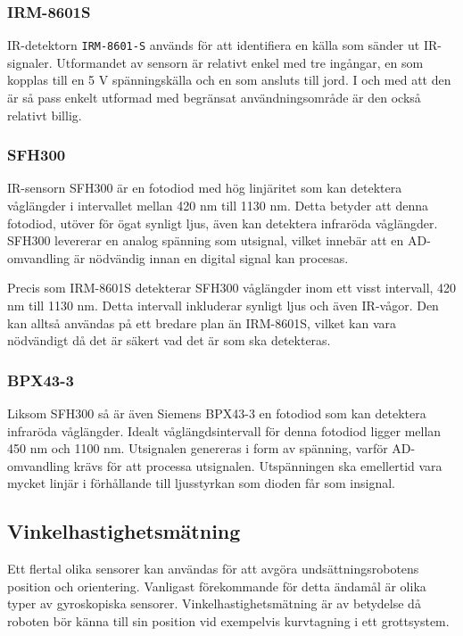 \documentclass[11pt]{article}
\begin{document}
\begin{flushleft}
\subsubsection{IRM-8601S} %
IR-detektorn \verb+IRM-8601-S+ används för att identifiera en källa som sänder ut IR-signaler. Utformandet av sensorn är relativt enkel med tre ingångar, en som kopplas till en 5 V spänningskälla och en som ansluts till jord. I och med att den är så pass enkelt utformad med begränsat användningsområde är den också relativt billig. \cite{IRM}

\subsubsection{SFH300} %
IR-sensorn SFH300 är en fotodiod med hög linjäritet som kan detektera våglängder i intervallet mellan 420 nm till 1130 nm. Detta betyder att denna fotodiod, utöver för ögat synligt ljus, även kan detektera infraröda våglängder. SFH300 levererar en analog spänning som utsignal, vilket innebär att en AD-omvandling är nödvändig innan en digital signal kan procesas. \cite{Osram}

Precis som IRM-8601S detekterar SFH300 våglängder inom ett visst intervall, 420 nm till 1130 nm. Detta intervall inkluderar synligt ljus och även IR-vågor. Den kan alltså användas på ett bredare plan än IRM-8601S, vilket kan vara nödvändigt då det är säkert vad det är som ska detekteras. \cite{Osram}

\subsubsection{BPX43-3}
Liksom SFH300 så är även Siemens BPX43-3 en fotodiod som kan detektera infraröda våglängder. Idealt våglängdsintervall för denna fotodiod ligger mellan 450 nm och 1100 nm. Utsignalen genereras i form av spänning, varför AD-omvandling krävs för att processa utsignalen. Utspänningen ska emellertid vara mycket linjär i förhållande till ljusstyrkan som dioden får som insignal. \cite{siemens}

\subsection{Vinkelhastighetsmätning}
Ett flertal olika sensorer kan användas för att avgöra undsättningsrobotens position och orientering. Vanligast förekommande för detta ändamål är olika typer av gyroskopiska sensorer. Vinkelhastighetsmätning är av betydelse då roboten bör känna till sin position vid exempelvis kurvtagning i ett grottsystem.


\end{flushleft}
\end{document}
